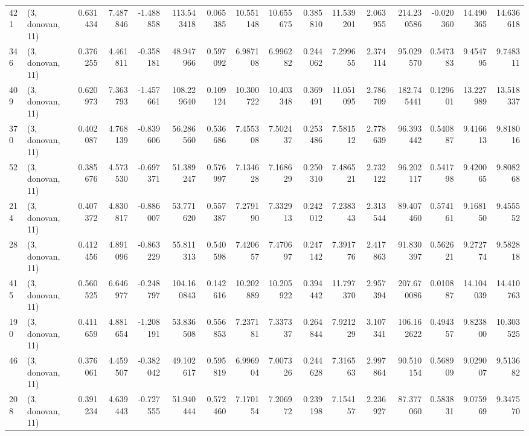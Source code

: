 \begin{tabular}{llrrrrrrrrrrrrrr}
421 &  (3, donovan, 11) &   0.631434 &   7.487846 &  -1.488858 &   113.543418 &   0.065385 &  10.551148 &  10.655675 &  0.385810 &  11.539201 &   2.063955 &   214.230586 & -0.020360 &  14.490365 &  14.636618 \\
346 &  (3, donovan, 11) &   0.376255 &   4.461811 &  -0.358181 &    48.947966 &   0.597092 &   6.987108 &   6.996282 &  0.244062 &   7.299655 &   2.374114 &    95.029570 &  0.547383 &   9.454795 &   9.748311 \\
409 &  (3, donovan, 11) &   0.620973 &   7.363793 &  -1.457661 &   108.229640 &   0.109124 &  10.300722 &  10.403348 &  0.369491 &  11.051095 &   2.786709 &   182.745441 &  0.129601 &  13.227989 &  13.518337 \\
370 &  (3, donovan, 11) &   0.402087 &   4.768139 &  -0.839606 &    56.286560 &   0.536686 &   7.455308 &   7.502437 &  0.253486 &   7.581512 &   2.778639 &    96.393442 &  0.540887 &   9.416613 &   9.818016 \\
52  &  (3, donovan, 11) &   0.385676 &   4.573530 &  -0.697371 &    51.389247 &   0.576997 &   7.134628 &   7.168629 &  0.250310 &   7.486521 &   2.732122 &    96.202117 &  0.541798 &   9.420065 &   9.808268 \\
214 &  (3, donovan, 11) &   0.407372 &   4.830817 &  -0.886007 &    53.771620 &   0.557387 &   7.279190 &   7.332913 &  0.242012 &   7.238343 &   2.313544 &    89.407460 &  0.574161 &   9.168150 &   9.455552 \\
28  &  (3, donovan, 11) &   0.412456 &   4.891096 &  -0.863229 &    55.811313 &   0.540598 &   7.420657 &   7.470697 &  0.247142 &   7.391776 &   2.417863 &    91.830397 &  0.562621 &   9.272774 &   9.582818 \\
415 &  (3, donovan, 11) &   0.560525 &   6.646977 &  -0.248797 &   104.160843 &   0.142616 &  10.202889 &  10.205922 &  0.394442 &  11.797370 &   2.957394 &   207.670086 &  0.010887 &  14.104039 &  14.410763 \\
190 &  (3, donovan, 11) &   0.411659 &   4.881654 &  -1.208191 &    53.836508 &   0.556853 &   7.237181 &   7.337337 &  0.264844 &   7.921229 &   3.107341 &   106.162622 &  0.494357 &   9.823800 &  10.303525 \\
46  &  (3, donovan, 11) &   0.376061 &   4.459507 &  -0.382042 &    49.102617 &   0.595819 &   6.996904 &   7.007326 &  0.244628 &   7.316563 &   2.997864 &    90.510154 &  0.568909 &   9.029007 &   9.513682 \\
208 &  (3, donovan, 11) &   0.391234 &   4.639443 &  -0.727555 &    51.940444 &   0.572460 &   7.170154 &   7.206972 &  0.239198 &   7.154157 &   2.236927 &    87.377060 &  0.583831 &   9.075969 &   9.347570 \\

\end{tabular}
